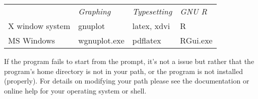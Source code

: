\begin{center}
  \begin{tabular}{llll}
    & \textit{Graphing} & \textit{Typesetting} & \textit{GNU R}\\
    X window system & gnuplot & latex, xdvi & R\\
    MS Windows & wgnuplot.exe & pdflatex & RGui.exe\\
  \end{tabular}
\end{center}

If the program fails to start from the prompt, it's not a 
issue but rather that the program's home directory is not in your
path, or the program is not installed (properly).  For details on
modifying your path please see the documentation or online help for
your operating system or shell.
    

